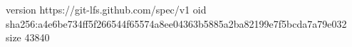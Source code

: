 version https://git-lfs.github.com/spec/v1
oid sha256:a4e6be734ff5f266544f65574a8ee04363b5885a2ba82199e7f5bcda7a79e032
size 43840
